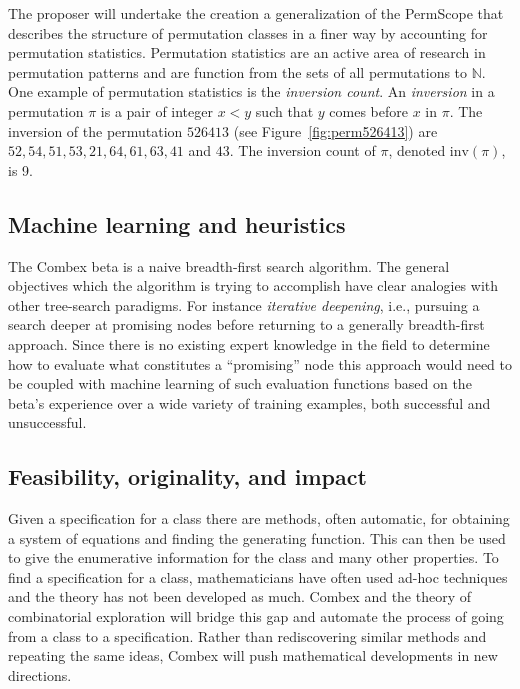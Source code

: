 \documentclass{rannis}
\newcommand{\motheralg}{\textsf{Combex}}
\newcommand{\tilealg}{\textsf{PermScope}}
\theoremstyle{definition}
\begin{document}
The proposer will undertake the creation
a generalization of the \tilealg{} that describes the structure of permutation
classes in a finer way by accounting for permutation statistics.
Permutation statistics are an active area of research in permutation patterns
\cite{bukata2019statisitics,dokos2012statistics,
babson2000vincular,branden2011meshpattern} and are function from the sets of all
permutations to $\mathbb{N}$.
One example of permutation statistics is the \emph{inversion count}.
An \emph{inversion} in a permutation $\pi$ is a pair of integer $x < y$ such that $y$
comes before $x$ in $\pi$. The inversion of the permutation $526413$
(see Figure~\ref{fig:perm526413}) are $52, 54,51,53,21,64,61,63,41$ and $43$.
The inversion count of $\pi$, denoted $\mathrm{inv}(\pi)$, is 9.


\subsection*{Machine learning and heuristics}
The \motheralg{} beta is a naive breadth-first search algorithm. The
general objectives which the algorithm is trying to accomplish have clear
analogies with other tree-search paradigms. For instance
\emph{iterative deepening}, i.e., pursuing a search deeper at promising nodes
before returning to a generally breadth-first approach. Since there is no
existing expert knowledge in the field to determine how to evaluate what
constitutes a ``promising'' node this approach would need to be coupled with
machine learning of such evaluation functions based on the beta's
experience over a wide variety of training examples, both successful and
unsuccessful.

\subsection*{Feasibility, originality, and impact}
Given a
specification for a class there are methods, often automatic, for
obtaining a system of equations and finding the generating function.
This can then be used to give the enumerative information for
the class and many other properties. To find a
specification for a class, mathematicians have often
used ad-hoc techniques and the theory has not been developed as much.
\motheralg{} and the theory of combinatorial exploration will bridge this gap
and automate the process of going from a class to a
specification. Rather than rediscovering similar methods and repeating the same
ideas, \motheralg{} will push mathematical developments in new directions.
\end{document}

